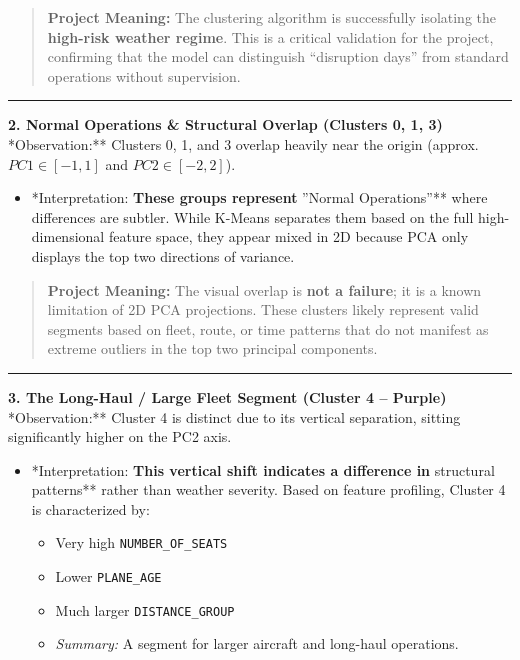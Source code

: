 \documentclass[11pt]{article}
\providecommand{\tightlist}{%
      \setlength{\itemsep}{0pt}\setlength{\parskip}{0pt}}
\begin{document}
\begin{quote}
\textbf{Project Meaning:} The clustering algorithm is successfully
isolating the \textbf{high-risk weather regime}. This is a critical
validation for the project, confirming that the model can distinguish
``disruption days'' from standard operations without supervision.
\end{quote}

\begin{center}\rule{0.5\linewidth}{0.5pt}\end{center}

\textbf{2. Normal Operations \& Structural Overlap (Clusters 0, 1, 3)}
*Observation:** Clusters 0, 1, and 3 overlap heavily near the origin
(approx. \(PC1 \in [-1, 1]\) and \(PC2 \in [-2, 2]\)).

\begin{itemize}
\tightlist
\item
  *Interpretation:\textbf{ These groups represent }''Normal
  Operations''** where differences are subtler. While K-Means separates
  them based on the full high-dimensional feature space, they appear
  mixed in 2D because PCA only displays the top two directions of
  variance.
\end{itemize}

\begin{quote}
\textbf{Project Meaning:} The visual overlap is \textbf{not a failure};
it is a known limitation of 2D PCA projections. These clusters likely
represent valid segments based on fleet, route, or time patterns that do
not manifest as extreme outliers in the top two principal components.
\end{quote}

\begin{center}\rule{0.5\linewidth}{0.5pt}\end{center}

\textbf{3. The Long-Haul / Large Fleet Segment (Cluster 4 -- Purple)}
*Observation:** Cluster 4 is distinct due to its vertical separation,
sitting significantly higher on the PC2 axis.

\begin{itemize}
\tightlist
\item
  *Interpretation:\textbf{ This vertical shift indicates a difference in
  }structural patterns** rather than weather severity. Based on feature
  profiling, Cluster 4 is characterized by:

  \begin{itemize}
  \tightlist
  \item
    Very high \texttt{NUMBER\_OF\_SEATS}
  \item
    Lower \texttt{PLANE\_AGE}
  \item
    Much larger \texttt{DISTANCE\_GROUP}
  \item
    \emph{Summary:} A segment for larger aircraft and long-haul
    operations.
  \end{itemize}
\end{itemize}
\end{document}
